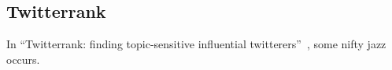 \documentclass[11pt]{article}
\newcommand{\titlecite}[2]{``#1''~\cite{#2}}
\begin{document}
\subsection{Twitterrank}
In \titlecite{Twitterrank: finding topic-sensitive influential twitterers}{weng2010twitterrank}, 
some nifty jazz occurs.
\end{document}
